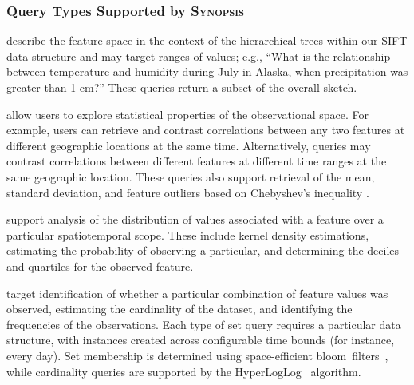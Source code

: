 \documentclass[9pt,journal,compsoc]{IEEEtran}
\begin{document}
\subsubsection{Query Types Supported by \textsc{Synopsis}}
\begin{description}[leftmargin=*]
    \item[Relational Queries] describe the feature space in the context of the hierarchical trees within our SIFT data structure and may target ranges of values; e.g., ``What is the relationship between temperature and humidity during July in Alaska, when precipitation was greater than 1 cm?'' These queries return a subset of the overall sketch.

    \item[Statistical Queries] allow users to explore statistical properties of the observational space. For example, users can retrieve and contrast correlations between any two features at different geographic locations at the same time. Alternatively, queries may contrast correlations between different features at different time ranges at the same geographic location. These queries also support retrieval of the mean, standard deviation, and feature outliers based on Chebyshev's inequality \cite{knuth1968art}.

    \item[Density Queries] support analysis of the distribution of values associated with a feature over a particular spatiotemporal scope. These include kernel density estimations, estimating the probability of observing a particular, and determining the deciles and quartiles for the observed feature.%

    \item[Set Queries] target identification of whether a particular combination of feature values was observed, estimating the cardinality of the dataset, and identifying the frequencies of the observations. Each type of set query requires a particular data structure, with instances created across configurable time bounds (for instance, every day). Set membership is determined using space-efficient bloom~filters~\cite{bloom1970space}, while cardinality queries are supported by the HyperLogLog~\cite{flajolet2007hyperloglog} algorithm.


\end{description}
\end{document}
